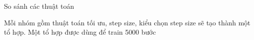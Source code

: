 \documentclass[10pt]{beamer}
\theoremstyle{remark}
\theoremstyle{definition}
\begin{document}
\begin{frame}{So sánh các thuật toán}
	\begin{figure}[!htp]
		\hfill
	  \end{figure}

	Mỗi nhóm gồm thuật toán tối ưu, step size, kiểu chọn step size sẽ tạo thành một tổ hợp.
	Một tổ hợp được dùng để train 5000 bước

\end{frame}
\end{document}
